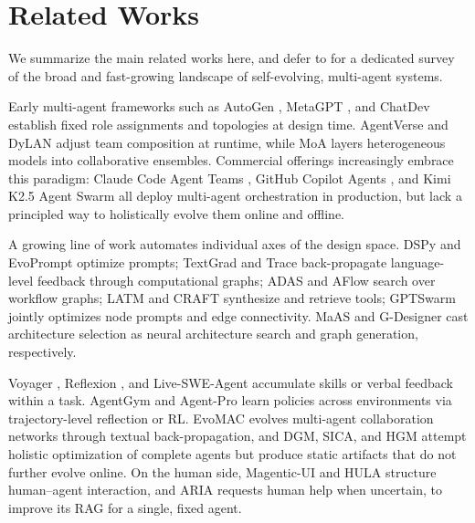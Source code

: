 \section{Related Works}
\label{sec:relatedworks}
We summarize the main related works here, and defer to \cite{gao2025selfevolvingsurvey} for a dedicated survey of the broad and fast-growing landscape of self-evolving, multi-agent systems.

Early multi-agent frameworks such as AutoGen \cite{autogen2024}, MetaGPT \cite{metagpt2024}, and ChatDev \cite{chatdev2024} establish fixed role assignments and topologies at design time. AgentVerse \cite{agentverse2024} and DyLAN \cite{dylan2024} adjust team composition at runtime, while MoA \cite{moa2025} layers heterogeneous models into collaborative ensembles. Commercial offerings increasingly embrace this paradigm: Claude Code Agent Teams \cite{anthropic2026agentteams}, GitHub Copilot Agents \cite{github2025copilotsubagents}, and Kimi K2.5 Agent Swarm \cite{moonshot2026agentswarm} all deploy multi-agent orchestration in production, but lack a principled way to holistically evolve them online and offline.

A growing line of work automates individual axes of the design space. DSPy \cite{dspy2024} and EvoPrompt \cite{evoprompt2024} optimize prompts; TextGrad \cite{textgrad2025} and Trace \cite{trace2024} back-propagate language-level feedback through computational graphs; ADAS \cite{adas2025} and AFlow \cite{aflow2025} search over workflow graphs; LATM \cite{latm2024} and CRAFT \cite{craft2024} synthesize and retrieve tools; GPTSwarm \cite{gptswarm2024} jointly optimizes node prompts and edge connectivity. MaAS \cite{maas2025} and G-Designer \cite{gdesigner2025} cast architecture selection as neural architecture search and graph generation, respectively.

Voyager \cite{voyager2023}, Reflexion \cite{reflexion2023}, and Live-SWE-Agent \cite{livesweagent2025} accumulate skills or verbal feedback within a task. AgentGym \cite{agentgym2025} and Agent-Pro \cite{agentpro2024} learn policies across environments via trajectory-level reflection or RL. EvoMAC \cite{evomac2025} evolves multi-agent collaboration networks through textual back-propagation, and DGM, SICA, and HGM \cite{dgm2025,robeyns2025selfimproving,wang2025huxley} attempt holistic optimization of complete agents but produce static artifacts that do not further evolve online. On the human side, Magentic-UI \cite{magenticui2025} and HULA \cite{hula2025} structure human--agent interaction, and ARIA \cite{aria2025} requests human help when uncertain, to improve its RAG for a single, fixed agent.

